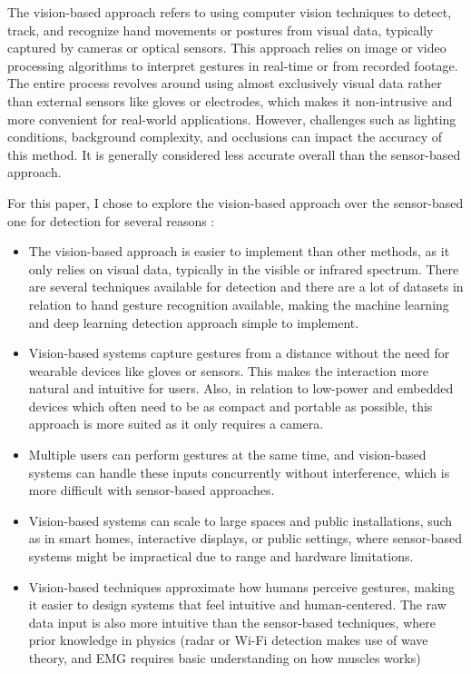 \documentclass[12pt]{article}
\begin{document}
The vision-based approach refers to using computer vision techniques to detect, track, and recognize hand movements or postures from visual data, typically captured by cameras or optical sensors. This approach relies on image or video processing algorithms to interpret gestures in real-time or from recorded footage. The entire process revolves around using almost exclusively visual data rather than external sensors like gloves or electrodes, which makes it non-intrusive and more convenient for real-world applications. However, challenges such as lighting conditions, background complexity, and occlusions can impact the accuracy of this method. It is generally considered less accurate overall than the sensor-based approach.

For this paper, I chose to explore the vision-based approach over the sensor-based one for detection for several reasons :

\begin{itemize}
  \item The vision-based approach is easier to implement than other methods, as it only relies on visual data, typically in the visible or infrared spectrum. There are several techniques available for detection and there are a lot of datasets in relation to hand gesture recognition available, making the machine learning and deep learning detection approach simple to implement. 
  \item Vision-based systems capture gestures from a distance without the need for wearable devices like gloves or sensors. This makes the interaction more natural and intuitive for users. Also, in relation to low-power and embedded devices which often need to be as compact and portable as possible, this approach is more suited as it only requires a camera.
  \item Multiple users can perform gestures at the same time, and vision-based systems can handle these inputs concurrently without interference, which is more difficult with sensor-based approaches.
  \item Vision-based systems can scale to large spaces and public installations, such as in smart homes, interactive displays, or public settings, where sensor-based systems might be impractical due to range and hardware limitations.
  \item Vision-based techniques approximate how humans perceive gestures, making it easier to design systems that feel intuitive and human-centered. The raw data input is also more intuitive than the sensor-based techniques, where prior knowledge in physics (radar or Wi-Fi detection makes use of wave theory, and EMG requires basic understanding on how muscles works)
\end{itemize}
\end{document}
